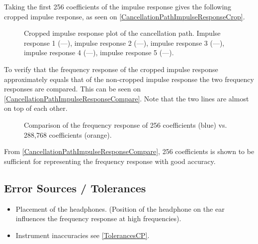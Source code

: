 Taking the first 256 coefficients of the impulse response gives the following cropped impulse response, as seen on \autoref{CancellationPathImpulseResponseCrop}.

\begin{figure}[H]
	\centering
	
	\caption{Cropped impulse response plot of the cancellation path. Impulse response 1 (\textcolor{MATLABblue}{---}), 
	impulse response 2 (\textcolor{MATLABorange}{---}), 	
	impulse response 3 (\textcolor{MATLAByellow}{---}), 	
	impulse response 4 (\textcolor{MATLABpurple}{---}), 	
	impulse response 5 (\textcolor{MATLABgreen}{---}).}
	\label{CancellationPathImpulseResponseCrop}
\end{figure}

To verify that the frequency response of the cropped impulse response approximately equals that of the non-cropped impulse response the two frequency responses are compared. This can be seen on \autoref{CancellationPathImpulseResponseCompare}. Note that the two lines are almost on top of each other.

\begin{figure}[H]
	\centering
	
	\caption{Comparison of the frequency response of 256 coefficients (blue) vs. 288,768 coefficients (orange).}
	\label{CancellationPathImpulseResponseCompare}
\end{figure}

From \autoref{CancellationPathImpulseResponseCompare}, 256 coefficients is shown to be sufficient for representing the frequency response with good accuracy. 

\subsection{Error Sources / Tolerances}
\begin{itemize}
	\item Placement of the headphones. (Position of the headphone on the ear  influences the frequency response at high frequencies). 
	\item Instrument inaccuracies see \autoref{TolerancesCP}.
\end{itemize}

